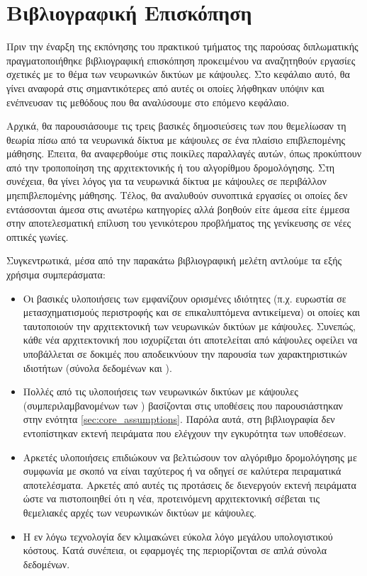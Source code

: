 \chapter{Βιβλιογραφική Επισκόπηση}
\label{chap:related_work}

Πριν την έναρξη της εκπόνησης του πρακτικού τμήματος της παρούσας διπλωματικής πραγματοποιήθηκε βιβλιογραφική επισκόπηση προκειμένου να αναζητηθούν εργασίες σχετικές με το θέμα των νευρωνικών δικτύων με κάψουλες. Στο κεφάλαιο αυτό, θα γίνει αναφορά στις σημαντικότερες από αυτές οι οποίες λήφθηκαν υπόψιν και ενέπνευσαν τις μεθόδους που θα αναλύσουμε στο επόμενο κεφάλαιο. \par

Αρχικά, θα παρουσιάσουμε τις τρεις βασικές δημοσιεύσεις των  \cite{hinton2011transforming, sabour2017dynamic, hinton2018matrix} που θεμελίωσαν τη θεωρία πίσω από τα νευρωνικά δίκτυα με κάψουλες σε ένα πλαίσιο επιβλεπομένης μάθησης. Έπειτα, θα αναφερθούμε στις ποικίλες παραλλαγές αυτών, όπως προκύπτουν από την τροποποίηση της αρχιτεκτονικής ή του αλγορίθμου δρομολόγησης. Στη συνέχεια, θα γίνει λόγος για τα νευρωνικά δίκτυα με κάψουλες σε περιβάλλον μη\textendash επιβλεπομένης μάθησης. Τέλος, θα αναλυθούν συνοπτικά εργασίες οι οποίες δεν εντάσσονται άμεσα στις ανωτέρω κατηγορίες αλλά βοηθούν είτε άμεσα είτε έμμεσα στην αποτελεσματική επίλυση του γενικότερου προβλήματος της γενίκευσης σε νέες οπτικές γωνίες.\par

Συγκεντρωτικά, μέσα από την παρακάτω βιβλιογραφική μελέτη αντλούμε τα εξής χρήσιμα συμπεράσματα:
\begin{itemize}
    \item Οι βασικές υλοποιήσεις των  εμφανίζουν ορισμένες ιδιότητες (π.χ. ευρωστία σε μετασχηματισμούς περιστροφής και σε επικαλυπτόμενα αντικείμενα) οι οποίες και ταυτοποιούν την αρχιτεκτονική των νευρωνικών δικτύων με κάψουλες. Συνεπώς, κάθε νέα αρχιτεκτονική που ισχυρίζεται ότι αποτελείται από κάψουλες οφείλει να υποβάλλεται σε δοκιμές που αποδεικνύουν την παρουσία των χαρακτηριστικών ιδιοτήτων (σύνολα δεδομένων  και ).
    \item Πολλές από τις υλοποιήσεις των νευρωνικών δικτύων με κάψουλες (συμπεριλαμβανομένων των \cite{hinton2011transforming, sabour2017dynamic, hinton2018matrix}) βασίζονται στις υποθέσεις που παρουσιάστηκαν στην ενότητα \ref{sec:core_assumptions}. Παρόλα αυτά, στη βιβλιογραφία δεν εντοπίστηκαν εκτενή πειράματα που ελέγχουν την εγκυρότητα των υποθέσεων.
    \item Αρκετές υλοποιήσεις επιδιώκουν να βελτιώσουν τον αλγόριθμο δρομολόγησης με συμφωνία με σκοπό να είναι ταχύτερος ή να οδηγεί σε καλύτερα πειραματικά αποτελέσματα. Αρκετές από αυτές τις προτάσεις δε διενεργούν εκτενή πειράματα ώστε να πιστοποιηθεί ότι η νέα, προτεινόμενη αρχιτεκτονική σέβεται τις θεμελιακές αρχές των νευρωνικών δικτύων με κάψουλες.
    \item Η εν λόγω τεχνολογία δεν κλιμακώνει εύκολα λόγο μεγάλου υπολογιστικού κόστους. Κατά συνέπεια, οι εφαρμογές της περιορίζονται σε απλά σύνολα δεδομένων.
\end{itemize}

